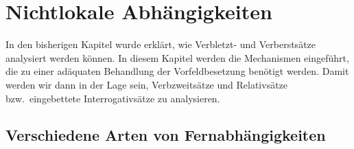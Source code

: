 
\chapter{Nichtlokale Abhängigkeiten}
\label{Kapitel-nla}

In den bisherigen Kapitel wurde erklärt, wie Verbletzt- und Verberstsätze analysiert werden können. In diesem Kapitel werden 
die Mechanismen eingeführt, die zu einer adäquaten Behandlung der Vorfeldbesetzung benötigt
werden. Damit werden wir dann in der Lage sein, Verbzweitsätze und Relativsätze bzw.\ eingebettete Interrogativsätze zu analysieren.

\section{Verschiedene Arten von Fernabhängigkeiten}

